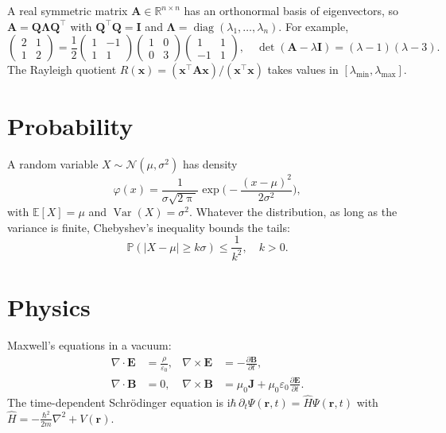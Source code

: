 \documentclass[11pt]{article}
\begin{document}
A real symmetric matrix $\mathbf{A} \in \mathbb{R}^{n \times n}$ has an orthonormal basis of eigenvectors,
so $\mathbf{A} = \mathbf{Q} \boldsymbol{\Lambda} \mathbf{Q}^\top$ with $\mathbf{Q}^\top \mathbf{Q} = \mathbf{I}$ and $\boldsymbol{\Lambda} = \operatorname{diag}(\lambda_1, \dots, \lambda_n)$.
For example,
\begin{equation}
  \begin{pmatrix} 2 & 1 \\ 1 & 2 \end{pmatrix}
  = \frac{1}{2} \begin{pmatrix} 1 & -1 \\ 1 & 1 \end{pmatrix}
  \begin{pmatrix} 1 & 0 \\ 0 & 3 \end{pmatrix}
  \begin{pmatrix} 1 & 1 \\ -1 & 1 \end{pmatrix}, \quad
  \det(\mathbf{A} - \lambda \mathbf{I}) = (\lambda - 1)(\lambda - 3).
\end{equation}
The Rayleigh quotient $R(\boldsymbol{x}) = (\boldsymbol{x}^\top \mathbf{A} \boldsymbol{x}) / (\boldsymbol{x}^\top \boldsymbol{x})$
takes values in $[\lambda_{\min}, \lambda_{\max}]$.

\section{Probability}

A random variable $X \sim \mathcal{N}(\mu, \sigma^2)$ has density
\begin{equation}
  \varphi(x) = \frac{1}{\sigma\sqrt{2\uppi}} \exp\biggl(-\frac{(x - \mu)^2}{2\sigma^2}\biggr),
\end{equation}
with $\mathbb{E}[X] = \mu$ and $\operatorname{Var}(X) = \sigma^2$. Whatever the distribution,
as long as the variance is finite, Chebyshev's inequality bounds the tails:
\begin{equation}
  \mathbb{P}(\lvert X - \mu\rvert \ge k\sigma) \le \frac{1}{k^2}, \quad k > 0.
\end{equation}

\section{Physics}

Maxwell's equations in a vacuum:
\begin{equation}
\begin{aligned}
  \nabla \cdot \boldsymbol{E} &= \frac{\rho}{\varepsilon_0}, &
  \nabla \times \boldsymbol{E} &= -\frac{\partial \boldsymbol{B}}{\partial t}, \\
  \nabla \cdot \boldsymbol{B} &= 0, &
  \nabla \times \boldsymbol{B} &= \mu_0 \boldsymbol{J} + \mu_0 \varepsilon_0 \frac{\partial \boldsymbol{E}}{\partial t}.
\end{aligned}
\end{equation}
The time-dependent Schrödinger equation is
$\mathrm{i}\hbar\, \partial_t \Psi(\boldsymbol{r}, t) = \hat{H} \Psi(\boldsymbol{r}, t)$ with
$\hat{H} = -\frac{\hbar^2}{2m} \nabla^2 + V(\boldsymbol{r})$.
\end{document}
